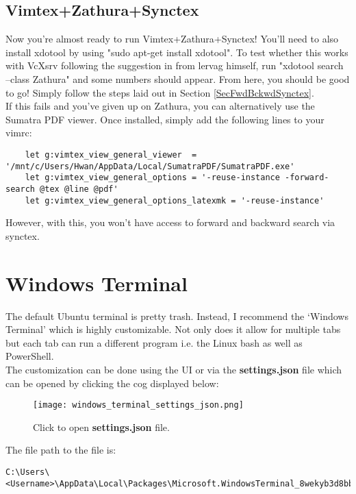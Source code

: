 \subsection{Vimtex+Zathura+Synctex}
Now you're almost ready to run Vimtex+Zathura+Synctex! You'll need to also
install xdotool by using "sudo apt-get install xdotool". To test whether this
works with VcXsrv following the suggestion in \cite{paulrougieux2020vimtex} from
lervag himself, run "xdotool search --class Zathura" and some numbers should
appear. From here, you should be good to go! Simply follow the steps laid out in
Section \ref{SecFwdBckwdSynctex}.\\

If this fails and you've given up on Zathura, you can alternatively use the
Sumatra PDF viewer. Once installed, simply add the following lines to your
vimrc:
\begin{lstlisting}
    let g:vimtex_view_general_viewer  = '/mnt/c/Users/Hwan/AppData/Local/SumatraPDF/SumatraPDF.exe'
    let g:vimtex_view_general_options = '-reuse-instance -forward-search @tex @line @pdf'
    let g:vimtex_view_general_options_latexmk = '-reuse-instance'
\end{lstlisting}
However, with this, you won't have access to forward and backward search via
synctex.

\section{Windows Terminal}
The default Ubuntu terminal is pretty trash. Instead, I recommend the `Windows
Terminal' which is highly customizable. Not only does it allow for multiple tabs
but each tab can run a different program i.e. the Linux bash as well as
PowerShell.\\

The customization can be done using the UI or via the \textbf{settings.json}
file which can be opened by clicking the cog displayed below:
\begin{figure}[H]
    \centering
    \texttt{[image: windows\_terminal\_settings\_json.png]}
    \caption{Click to open \textbf{settings.json} file.}
    \label{FigWindowsTerminalSettingsJSON}
\end{figure}
The file path to the file is:
\begin{lstlisting}
C:\Users\<Username>\AppData\Local\Packages\Microsoft.WindowsTerminal_8wekyb3d8bbwe\LocalState
\end{lstlisting}

